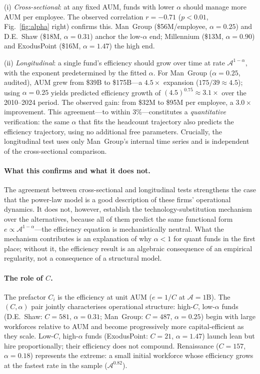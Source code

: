 \documentclass[10pt,onecolumn]{article}
\newcommand{\Ac}{\mathcal{A}}
\begin{document}
(i) \emph{Cross-sectional}: at any fixed AUM, funds with lower
$\alpha$ should manage more AUM per employee.
The observed correlation $r = -0.71$ ($p < 0.01$,
Fig.~\ref{fig:alpha} right) confirms this.
Man~Group (\$56M/employee, $\alpha = 0.25$) and
D.E.~Shaw (\$18M, $\alpha = 0.31$) anchor the low-$\alpha$ end;
Millennium (\$13M, $\alpha = 0.90$) and ExodusPoint
(\$16M, $\alpha = 1.47$) the high end.

(ii) \emph{Longitudinal}: a single fund's efficiency should grow
over time at rate $\Ac^{1-\alpha}$, with the exponent
predetermined by the fitted $\alpha$.
For Man~Group ($\alpha = 0.25$, audited), AUM grew from \$39B to
\$175B---a $4.5\times$ expansion ($175/39 \approx 4.5$); using
$\alpha = 0.25$ yields predicted efficiency growth of
$(4.5)^{0.75} \approx 3.1\times$ over the 2010--2024 period.
The observed gain: from \$32M to \$95M per employee,
a $3.0\times$ improvement.
This agreement---to within 3\%---constitutes a \emph{quantitative}
verification: the same $\alpha$ that fits the headcount trajectory
also predicts the efficiency trajectory, using no additional
free parameters.
Crucially, the longitudinal test uses only Man~Group's internal
time series and is independent of the cross-sectional comparison.

\paragraph{What this confirms and what it does not.}
The agreement between cross-sectional and longitudinal tests
strengthens the case that the power-law model is a good
description of these firms' operational dynamics.
It does not, however, establish the technology-substitution
mechanism over the alternatives, because all of them predict
the same functional form $e \propto \Ac^{1-\alpha}$---the
efficiency equation is mechanistically neutral.
What the mechanism contributes is an explanation of why
$\alpha < 1$ for quant funds in the first place; without
it, the efficiency result is an algebraic consequence of
an empirical regularity, not a consequence of a structural model.

\paragraph{The role of $C$.}
The prefactor $C_i$ is the efficiency at unit AUM ($e = 1/C$ at
$\Ac = 1$B).
The $(C, \alpha)$ pair jointly characterises operational structure:
high-$C$, low-$\alpha$ funds (D.E.~Shaw: $C{=}581$, $\alpha{=}0.31$;
Man~Group: $C{=}487$, $\alpha{=}0.25$) begin with large workforces
relative to AUM and become progressively more capital-efficient
as they scale.
Low-$C$, high-$\alpha$ funds (ExodusPoint: $C{=}21$, $\alpha{=}1.47$)
launch lean but hire proportionally; their efficiency does not
compound.
Renaissance ($C{=}157$, $\alpha{=}0.18$) represents the extreme:
a small initial workforce whose efficiency grows at the fastest
rate in the sample ($\Ac^{0.82}$).
\end{document}
